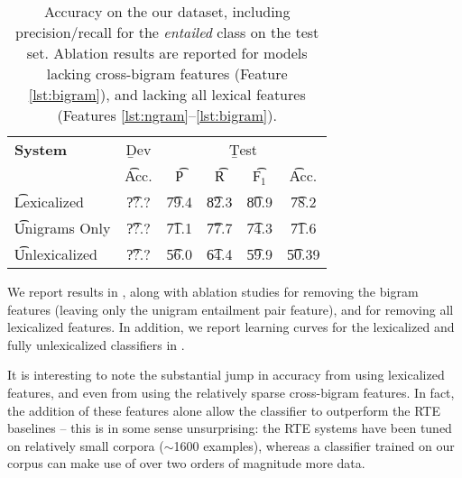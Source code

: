 \begin{table}
\begin{center}
\begin{tabular}{l@{\hskip \colspaceL}c@{\hskip \colspaceL}c@{\hskip \colspaceS}c@{\hskip \colspaceS}c@{\hskip \colspaceM}c}
\hline
\textbf{System} & \b{Dev} & \multicolumn{4}{c}{\b{Test}} \\
 & \t{Acc.} & \t{P} & \t{R} & \t{F$_1$} & \t{Acc.} \\
\hline
\t{Lexicalized}            & \t{??.?} & \t{79.4} & \t{82.3} & \t{80.9} & \t{78.2} \\
\t{Unigrams Only}          & \t{??.?} & \t{71.1} & \t{77.7} & \t{74.3} & \t{71.6} \\
\t{Unlexicalized}          & \t{??.?} & \t{56.0} & \t{64.4} & \t{59.9} & \t{50.39} \\
\hline
\end{tabular}
\end{center}
\caption{
\label{tab:bowresults}
Accuracy on the our dataset, including precision/recall for the
  \textit{entailed} class on the test set.
Ablation results are reported for models lacking cross-bigram features 
  (Feature \ref{lst:bigram}), and lacking all lexical
  features (Features \ref{lst:ngram}--\ref{lst:bigram}).
}
\end{table}
%
%


We report results in , along with ablation studies for removing
  the bigram features (leaving only the unigram entailment pair feature),
  and for removing all lexicalized features.
In addition, we report learning curves for the lexicalized and fully unlexicalized
  classifiers in .

It is interesting to note the substantial jump in accuracy from using
  lexicalized features, and even from using the relatively sparse
  cross-bigram features.
In fact, the addition of these features alone allow the classifier to
  outperform the RTE baselines -- this is in some sense unsurprising:
  the RTE systems have been tuned on relatively small corpora
  ($\sim$1600 examples), whereas a classifier trained on our corpus can make use of
  over two orders of magnitude more data.

